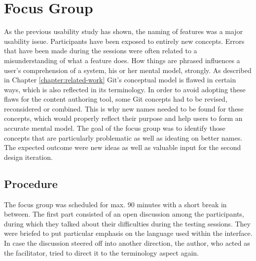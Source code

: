 \chapter{Focus Group} \label{chapter:focus-group}
As the previous usability study has shown, the naming of features was a major usability issue. Participants have been exposed to entirely new concepts. Errors that have been made during the sessions were often related to a misunderstanding of what a feature does. How things are phrased influences a user’s comprehension of a system, his or her mental model, strongly. As described in Chapter \ref{chapter:related-work} Git's conceptual model is flawed in certain ways, which is also reflected in its terminology. In order to avoid adopting these flaws for the content authoring tool, some Git concepts had to be revised, reconsidered or combined. This is why new names needed to be found for these concepts, which would properly reflect their purpose and help users to form an accurate mental model. The goal of the focus group was to identify those concepts that are particularly problematic as well as ideating on better names. The expected outcome were new ideas as well as valuable input for the second design iteration.





\section{Procedure}
The focus group was scheduled for max. 90 minutes with a short break in between. The first part consisted of an open discussion among the participants, during which they talked about their difficulties during the testing sessions. They were briefed to put particular emphasis on the language used within the interface. In case the discussion steered off into another direction, the author, who acted as the facilitator, tried to direct it to the terminology aspect again.

